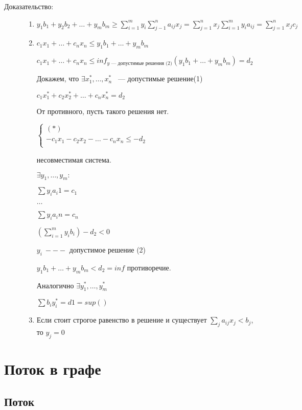 \documentclass[12pt]{article}
\begin{document}
\begin{description}
\begin{description}
\item[Доказательство:]

\begin{enumerate}
\item $y_1b_1 + y_2b_2 + \ldots + y_m b_m \ge \sum_{i = 1}^{m}y_i\sum_{j - 1}^{n}a_{ij}x_j = \sum_{j = 1}^{n}x_j \sum_{i = 1}^{m}y_i a_{ij} = \sum_{j = 1}^{n}x_jc_j$

\item $c_1 x_1 + \ldots + c_n x_n \le y_1 b_1 + \ldots + y_m b_m$

$c_1 x_1 + \ldots + c_n x_n \le inf_{y \text{~--- допустимые решения (2)}}(y_1 b_1 + \ldots + y_m b_m) = d_2$

Докажем, что $\exists x_1^*, \ldots, x_n^*$ ~--- допустимые решение(1)

$c_1 x_1^* + c_2 x_2^* + \ldots + c_n x_n^* = d_2$

От противного, пусть такого решения нет. 

$\begin{cases} (*)\\ -c_1x_1 - c_2x_2 - \ldots - c_nx_n \le -d_2 \\ \end{cases}$

несовместимая система.

$\exists y_1, \ldots, y_m:$

$\sum y_i a_i1 = c_1$

$\ldots$

$\sum y_i a_in = c_n$

$(\sum_{i = 1}^{m} y_i b_i) - d_2 < 0$

$y_i ~---$ допустимое решение (2)

$y_1b_1 + \ldots + y_mb_m < d_2 = inf$ противоречие. 

Аналогично $\exists y_1^*, \ldots,y_m^* $

$\sum b_iy_i^* = d1 = sup()$
\item Если стоит строгое равенство в решение и существует $\sum_{j}a_{ij}x_j < b_j $, то $y_j  = 0$
\end{enumerate}

\end{description}

\section{Поток в графе}

\subsection{Поток}


\end{description}
\end{document}
